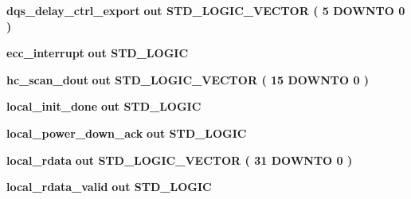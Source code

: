 \begin{DoxyCompactItemize}
\item 
{\bf dqs\+\_\+delay\+\_\+ctrl\+\_\+export}  {\bfseries {\bfseries \textcolor{keywordflow}{out}\textcolor{vhdlchar}{ }}} {\bfseries \textcolor{comment}{S\+T\+D\+\_\+\+L\+O\+G\+I\+C\+\_\+\+V\+E\+C\+T\+OR}\textcolor{vhdlchar}{ }\textcolor{vhdlchar}{(}\textcolor{vhdlchar}{ }\textcolor{vhdlchar}{ } \textcolor{vhdldigit}{5} \textcolor{vhdlchar}{ }\textcolor{keywordflow}{D\+O\+W\+N\+TO}\textcolor{vhdlchar}{ }\textcolor{vhdlchar}{ } \textcolor{vhdldigit}{0} \textcolor{vhdlchar}{ }\textcolor{vhdlchar}{)}\textcolor{vhdlchar}{ }} 
\item 
{\bf ecc\+\_\+interrupt}  {\bfseries {\bfseries \textcolor{keywordflow}{out}\textcolor{vhdlchar}{ }}} {\bfseries \textcolor{comment}{S\+T\+D\+\_\+\+L\+O\+G\+IC}\textcolor{vhdlchar}{ }} 
\item 
{\bf hc\+\_\+scan\+\_\+dout}  {\bfseries {\bfseries \textcolor{keywordflow}{out}\textcolor{vhdlchar}{ }}} {\bfseries \textcolor{comment}{S\+T\+D\+\_\+\+L\+O\+G\+I\+C\+\_\+\+V\+E\+C\+T\+OR}\textcolor{vhdlchar}{ }\textcolor{vhdlchar}{(}\textcolor{vhdlchar}{ }\textcolor{vhdlchar}{ } \textcolor{vhdldigit}{15} \textcolor{vhdlchar}{ }\textcolor{keywordflow}{D\+O\+W\+N\+TO}\textcolor{vhdlchar}{ }\textcolor{vhdlchar}{ } \textcolor{vhdldigit}{0} \textcolor{vhdlchar}{ }\textcolor{vhdlchar}{)}\textcolor{vhdlchar}{ }} 
\item 
{\bf local\+\_\+init\+\_\+done}  {\bfseries {\bfseries \textcolor{keywordflow}{out}\textcolor{vhdlchar}{ }}} {\bfseries \textcolor{comment}{S\+T\+D\+\_\+\+L\+O\+G\+IC}\textcolor{vhdlchar}{ }} 
\item 
{\bf local\+\_\+power\+\_\+down\+\_\+ack}  {\bfseries {\bfseries \textcolor{keywordflow}{out}\textcolor{vhdlchar}{ }}} {\bfseries \textcolor{comment}{S\+T\+D\+\_\+\+L\+O\+G\+IC}\textcolor{vhdlchar}{ }} 
\item 
{\bf local\+\_\+rdata}  {\bfseries {\bfseries \textcolor{keywordflow}{out}\textcolor{vhdlchar}{ }}} {\bfseries \textcolor{comment}{S\+T\+D\+\_\+\+L\+O\+G\+I\+C\+\_\+\+V\+E\+C\+T\+OR}\textcolor{vhdlchar}{ }\textcolor{vhdlchar}{(}\textcolor{vhdlchar}{ }\textcolor{vhdlchar}{ } \textcolor{vhdldigit}{31} \textcolor{vhdlchar}{ }\textcolor{keywordflow}{D\+O\+W\+N\+TO}\textcolor{vhdlchar}{ }\textcolor{vhdlchar}{ } \textcolor{vhdldigit}{0} \textcolor{vhdlchar}{ }\textcolor{vhdlchar}{)}\textcolor{vhdlchar}{ }} 
\item 
{\bf local\+\_\+rdata\+\_\+valid}  {\bfseries {\bfseries \textcolor{keywordflow}{out}\textcolor{vhdlchar}{ }}} {\bfseries \textcolor{comment}{S\+T\+D\+\_\+\+L\+O\+G\+IC}\textcolor{vhdlchar}{ }} 

\end{DoxyCompactItemize}
